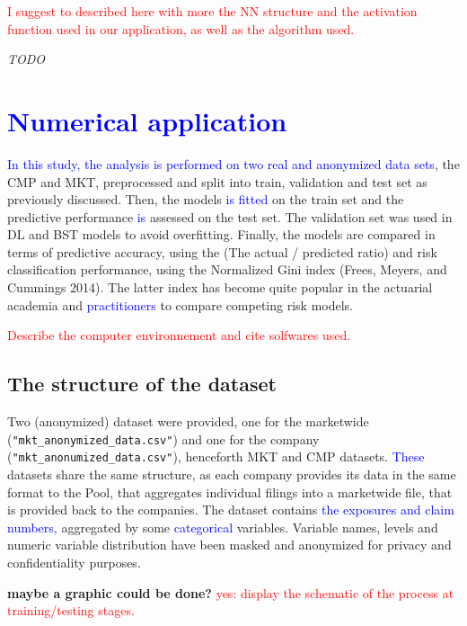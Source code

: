 \documentclass[
]{article}
\begin{document}
\textcolor{red}{I suggest to described here with more the NN structure and the activation function used in our application, as well as the algorithm used. }

\emph{TODO}

\hypertarget{section}{%
\section{\texorpdfstring{\textcolor{blue}{Numerical application}}{}}\label{section}}

\textcolor{blue}{In this study, the analysis is performed on two real and anonymized data sets},
the CMP and MKT, preprocessed and split into train, validation and test
set as previously discussed. Then, the models
\textcolor{blue}{is fitted} on the train set and the predictive
performance \textcolor{blue}{is} assessed on the test set. The
validation set was used in DL and BST models to avoid overfitting.
Finally, the models are compared in terms of predictive accuracy, using
the (The actual / predicted ratio) and risk classification performance,
using the Normalized Gini index (Frees, Meyers, and Cummings 2014). The
latter index has become quite popular in the actuarial academia and
\textcolor{blue}{practitioners} to compare competing risk models.

\textcolor{red}{Describe the computer environnement and cite solfwares used.}

\hypertarget{the-structure-of-the-dataset}{%
\subsection{The structure of the
dataset}\label{the-structure-of-the-dataset}}

Two (anonymized) dataset were provided, one for the marketwide
(\texttt{"mkt\_anonymized\_data.csv"}) and one for the company
(\texttt{"mkt\_anonumized\_data.csv"}), henceforth MKT and CMP datasets.
\textcolor{blue}{These} datasets share the same structure, as each
company provides its data in the same format to the Pool, that
aggregates individual filings into a marketwide file, that is provided
back to the companies. The dataset contains
\textcolor{blue}{the exposures and claim numbers,} aggregated by some
\textcolor{blue}{categorical} variables. Variable names, levels and
numeric variable distribution have been masked and anonymized for
privacy and confidentiality purposes.

\textbf{maybe a graphic could be done?}
\textcolor{red}{yes: display the schematic of the process at training/testing stages.}
\end{document}
